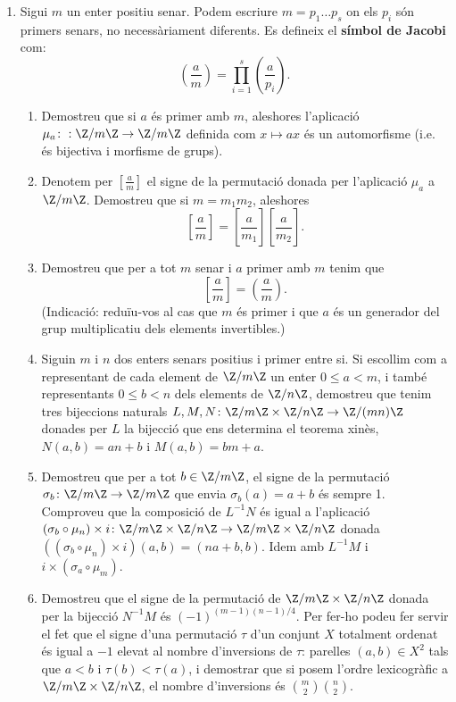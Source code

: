 \begin{enumerate}[leftmargin=*]
\item Sigui $m$ un enter positiu
senar. Podem escriure $m=p_1\dots p_s$ on els $p_i$ són primers
senars, no necessàriament diferents. Es defineix el \textbf{símbol de Jacobi}
com:
$$
\displaystyle{\left (\frac{a}{m} \right )=\prod_{i=1}^{s}\left
(\frac{a}{p_i} \right )}.
$$

\begin{enumerate}
\item Demostreu que si $a$ és primer amb $m$, aleshores
l'aplicació $\mu_a\colon : \Z/m\Z\to \Z/m\Z$ definida com $x\mapsto ax$ és un automorfisme
(i.e. és bijectiva i morfisme de grups).

\item Denotem per  $\displaystyle{\left[\frac{a}{m} \right]}$ el signe de la permutació donada per
l'aplicació $\mu_a$ a $\Z/m\Z$. Demostreu que si $m=m_1m_2$,
aleshores
$$
\displaystyle{\left[ \frac{a}{m} \right] =\left [\frac{a}{m_1}
\right]\left [\frac{a}{m_2} \right]}.
$$

\item Demostreu que per a tot $m$ senar i $a$ primer amb $m$
tenim que
$$\displaystyle{\left[\frac{a}{m} \right]}=\displaystyle{\left(\frac{a}{m}
\right)}.$$
(Indicació: reduïu-vos al cas que $m$ és primer i que $a$ és un generador del grup multiplicatiu dels elements invertibles.)
\item Siguin $m$ i $n$ dos enters senars positius i primer
entre si. Si escollim com a representant de cada element de $\Z/m\Z$
un enter $0\le a <m$, i també representants $0\le b<n$ dels
elements de $\Z/n\Z$, demostreu que tenim tres bijeccions naturals
$L,M,N\colon \Z/m\Z\times \Z/n\Z\to \Z/(mn)\Z$ donades per $L$ la
bijecció que ens determina el teorema xin\`{e}s, $N(a,b)=an+b$ i
$M(a,b)=bm+a$.

\item Demostreu que per a tot $b\in \Z/m\Z$, el signe de la permutació
$\sigma_b\colon\Z/m\Z\to \Z/m\Z$ que envia $\sigma_b(a)=a+b$ és
sempre 1.  Comproveu que la composició de $L^{-1}N$ és igual
a l'aplicació $(\sigma_b\circ \mu_n)\times i \colon\Z/m\Z\times
\Z/n\Z\to \Z/m\Z\times \Z/n\Z$ donada $((\sigma_b\circ \mu_n)\times
i)(a,b)=(na+b,b)$. Idem amb $L^{-1}M$ i $i\times (\sigma_a\circ
\mu_m)$.

\item Demostreu que el signe de la permutació de $\Z/m\Z\times \Z/n\Z$ donada per la
bijecció $N^{-1}M$ és $(-1)^{(m-1)(n-1)/4}$. Per fer-ho podeu
fer servir el fet que el signe d'una permutació $\tau$ d'un conjunt $X$
totalment ordenat és igual a $-1$ elevat al nombre d'inversions de
$\tau$: parelles $(a,b)\in X^2$ tals que $a<b$ i $\tau(b)<\tau(a)$,
i demostrar que si posem l'ordre lexicogràfic a $\Z/m\Z\times
\Z/n\Z$, el nombre d'inversions és $ \binom{m}{2}\binom{n}{2}$.


\end{enumerate}
\end{enumerate}
